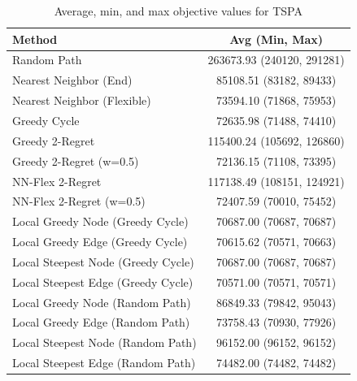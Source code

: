 \begin{table}[h!]
\centering
\begin{tabular}{lc}
\hline
Method & Avg (Min, Max) \\
\hline
Random Path & 263673.93 (240120, 291281) \\
Nearest Neighbor (End) & 85108.51 (83182, 89433) \\
Nearest Neighbor (Flexible) & 73594.10 (71868, 75953) \\
Greedy Cycle & 72635.98 (71488, 74410) \\
Greedy 2-Regret & 115400.24 (105692, 126860) \\
Greedy 2-Regret (w=0.5) & 72136.15 (71108, 73395) \\
NN-Flex 2-Regret & 117138.49 (108151, 124921) \\
NN-Flex 2-Regret (w=0.5) & 72407.59 (70010, 75452) \\
Local Greedy Node (Greedy Cycle) & 70687.00 (70687, 70687) \\
Local Greedy Edge (Greedy Cycle) & 70615.62 (70571, 70663) \\
Local Steepest Node (Greedy Cycle) & 70687.00 (70687, 70687) \\
Local Steepest Edge (Greedy Cycle) & 70571.00 (70571, 70571) \\
Local Greedy Node (Random Path) & 86849.33 (79842, 95043) \\
Local Greedy Edge (Random Path) & 73758.43 (70930, 77926) \\
Local Steepest Node (Random Path) & 96152.00 (96152, 96152) \\
Local Steepest Edge (Random Path) & 74482.00 (74482, 74482) \\
\hline
\end{tabular}
\caption{Average, min, and max objective values for TSPA}
\label{tab:TSPA_scores}
\end{table}
